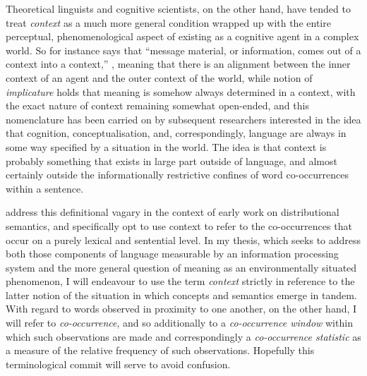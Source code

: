Theoretical linguists and cognitive scientists, on the other hand, have tended to treat \emph{context} as a much more general condition wrapped up with the entire perceptual, phenomenological aspect of existing as a cognitive agent in a complex world.  So for instance \citeauthor{Bateson1972} says that ``message material, or information, comes out of a context into a context,'' \cite[][p. 404]{Bateson1972}, meaning that there is an alignment between the inner context of an agent and the outer context of the world, while  notion of \emph{implicature} holds that meaning is somehow always determined in a context, with the exact nature of context remaining somewhat open-ended, and this nomenclature has been carried on by subsequent researchers interested in the idea that cognition, conceptualisation, and, correspondingly, language are always in some way specified by a situation in the world.  The idea is that context is probably something that exists in large part outside of language, and almost certainly outside the informationally restrictive confines of word co-occurrences within a sentence.

\cite{MillerEA1991} address this definitional vagary in the context of early work on distributional semantics, and specifically opt to use context to refer to the co-occurrences that occur on a purely lexical and sentential level.  In my thesis, which seeks to address both those components of language measurable by an information processing system and the more general question of meaning as an environmentally situated phenomenon, I will endeavour to use the term \emph{context} strictly in reference to the latter notion of the situation in which concepts and semantics emerge in tandem.  With regard to words observed in proximity to one another, on the other hand, I will refer to \emph{co-occurrence}, and so additionally to a \emph{co-occurrence window} within which such observations are made and correspondingly a \emph{co-occurrence statistic} as a measure of the relative frequency of such observations.  Hopefully this terminological commit will serve to avoid confusion.

